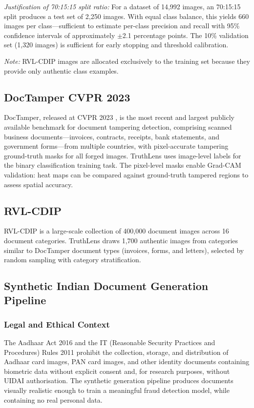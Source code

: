 \documentclass[12pt,a4paper,oneside]{report}
\begin{document}
\noindent\textit{Justification of 70:15:15 split ratio:} For a dataset of
14,992 images, an 70:15:15 split produces a test set of 2,250 images.
With equal class balance, this yields 660 images per class---sufficient to
estimate per-class precision and recall with 95\% confidence intervals of
approximately $\pm$2.1 percentage points. The 10\% validation set (1,320
images) is sufficient for early stopping and threshold calibration.

\textit{Note:} RVL-CDIP images are allocated exclusively to the training set
because they provide only authentic class examples.

\subsection{DocTamper CVPR 2023}

DocTamper, released at CVPR 2023 \cite{doctamper2023}, is the most recent and
largest publicly available benchmark for document tampering detection, comprising
scanned business documents---invoices, contracts, receipts, bank statements, and
government forms---from multiple countries, with pixel-accurate tampering
ground-truth masks for all forged images. TruthLens uses image-level labels for
the binary classification training task. The pixel-level masks enable Grad-CAM
validation: heat maps can be compared against ground-truth tampered regions to
assess spatial accuracy.

\subsection{RVL-CDIP}

RVL-CDIP \cite{rvlcdip} is a large-scale collection of 400,000 document images
across 16 document categories. TruthLens draws 1,700 authentic images from
categories similar to DocTamper document types (invoices, forms, and letters),
selected by random sampling with category stratification.

\subsection{Synthetic Indian Document Generation Pipeline}
\label{subsec:synth_pipeline}

\subsubsection{Legal and Ethical Context}

The Aadhaar Act 2016 and the IT (Reasonable Security Practices and Procedures)
Rules 2011 prohibit the collection, storage, and distribution of Aadhaar card
images, PAN card images, and other identity documents containing biometric data
without explicit consent and, for research purposes, without UIDAI authorisation.
The synthetic generation pipeline produces documents visually realistic enough
to train a meaningful fraud detection model, while containing no real personal data.
\end{document}
